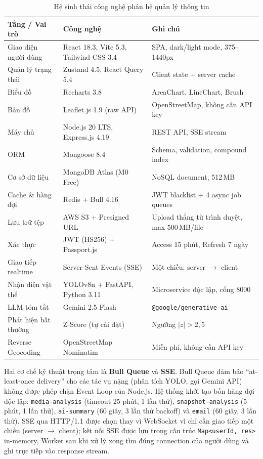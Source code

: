 \documentclass[../DoAn.tex]{subfiles}
\begin{document}
\begin{table}[H]
\centering
\caption{Hệ sinh thái công nghệ phân hệ quản lý thông tin}
\label{tab:ch7-techstack}
\small
\begin{tabular}{|p{3.6cm}|p{4.8cm}|p{4.8cm}|}
\hline
\textbf{Tầng / Vai trò} & \textbf{Công nghệ} & \textbf{Ghi chú} \\
\hline
Giao diện người dùng & React 18.3, Vite 5.3, Tailwind CSS 3.4 & SPA, dark/light mode, 375--1440px \\
\hline
Quản lý trạng thái & Zustand 4.5, React Query 5.4 & Client state + server cache \\
\hline
Biểu đồ & Recharts 3.8 & AreaChart, LineChart, Brush \\
\hline
Bản đồ & Leaflet.js 1.9 (raw API) & OpenStreetMap, không cần API key \\
\hline
Máy chủ & Node.js 20 LTS, Express.js 4.19 & REST API, SSE stream \\
\hline
ORM & Mongoose 8.4 & Schema, validation, compound index \\
\hline
Cơ sở dữ liệu & MongoDB Atlas (M0 Free) & NoSQL document, 512\,MB \\
\hline
Cache \& hàng đợi & Redis + Bull 4.16 & JWT blacklist + 4 async job queues \\
\hline
Lưu trữ tệp & AWS S3 + Presigned URL & Upload thẳng từ trình duyệt, max 500\,MB/file \\
\hline
Xác thực & JWT (HS256) + Passport.js & Access 15 phút, Refresh 7 ngày \\
\hline
Giao tiếp realtime & Server-Sent Events (SSE) & Một chiều: server $\to$ client \\
\hline
Nhận diện vật thể & YOLOv8n + FastAPI, Python 3.11 & Microservice độc lập, cổng 8000 \\
\hline
LLM tóm tắt & Gemini 2.5 Flash & \texttt{@google/generative-ai} \\
\hline
Phát hiện bất thường & Z-Score (tự cài đặt) & Ngưỡng $|z| > 2{,}5$ \\
\hline
Reverse Geocoding & OpenStreetMap Nominatim & Miễn phí, không cần API key \\
\hline
\end{tabular}
\end{table}

Hai cơ chế kỹ thuật trọng tâm là \textbf{Bull Queue} và \textbf{SSE}. Bull Queue đảm bảo ``at-least-once delivery'' cho các tác vụ nặng (phân tích YOLO, gọi Gemini API) không được phép chặn Event Loop của Node.js. Hệ thống khởi tạo bốn hàng đợi độc lập: \texttt{media-analysis} (timeout 25 phút, 1 lần thử), \texttt{snapshot-analysis} (5 phút, 1 lần thử), \texttt{ai-summary} (60 giây, 3 lần thử backoff) và \texttt{email} (60 giây, 3 lần thử). SSE qua HTTP/1.1 được chọn thay vì WebSocket vì chỉ cần giao tiếp một chiều (server $\to$ client); kết nối SSE được lưu trong cấu trúc \texttt{Map<userId, res>} in-memory, Worker sau khi xử lý xong tìm đúng connection của người dùng và ghi trực tiếp vào response stream.
\end{document}
